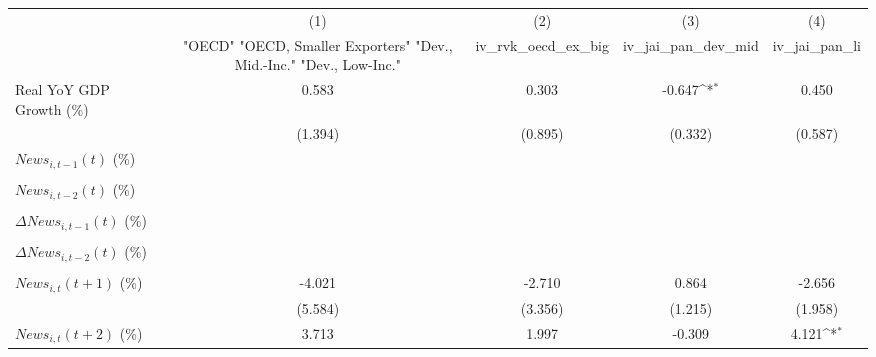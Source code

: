 {
\def\sym#1{\ifmmode^{#1}\else\(^{#1}\)\fi}
\begin{tabular}{l*{4}{c}}
\toprule
                    &\multicolumn{1}{c}{(1)}&\multicolumn{1}{c}{(2)}&\multicolumn{1}{c}{(3)}&\multicolumn{1}{c}{(4)}\\
                    &\multicolumn{1}{c}{ "OECD" "OECD, Smaller Exporters" "Dev., Mid.-Inc." "Dev., Low-Inc."}&\multicolumn{1}{c}{iv_rvk_oecd_ex_big}&\multicolumn{1}{c}{iv_jai_pan_dev_mid}&\multicolumn{1}{c}{iv_jai_pan_li}\\
\midrule
Real YoY GDP Growth (\%)&       0.583         &       0.303         &      -0.647\sym{*}  &       0.450         \\
                    &     (1.394)         &     (0.895)         &     (0.332)         &     (0.587)         \\
\addlinespace
$ News_{i,t-1}(t)$ (\%)&                     &                     &                     &                     \\
                    &                     &                     &                     &                     \\
\addlinespace
$ News_{i,t-2}(t)$ (\%)&                     &                     &                     &                     \\
                    &                     &                     &                     &                     \\
\addlinespace
$ \Delta News_{i,t-1}(t)$ (\%)&                     &                     &                     &                     \\
                    &                     &                     &                     &                     \\
\addlinespace
$ \Delta News_{i,t-2}(t)$ (\%)&                     &                     &                     &                     \\
                    &                     &                     &                     &                     \\
\addlinespace
$ News_{i,t}(t+1)$ (\%)&      -4.021         &      -2.710         &       0.864         &      -2.656         \\
                    &     (5.584)         &     (3.356)         &     (1.215)         &     (1.958)         \\
\addlinespace
$ News_{i,t}(t+2)$ (\%)&       3.713         &       1.997         &      -0.309         &       4.121\sym{*}  \\

\end{tabular}}
